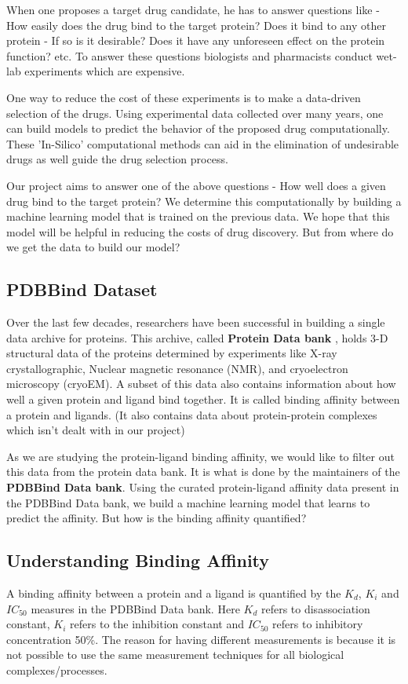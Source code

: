 \documentclass[11pt]{article}
\begin{document}
When one proposes a target drug candidate, he has to answer questions
like - How easily does the drug bind to the target protein?
Does it bind to any other protein - If so is it desirable?
Does it have any unforeseen effect on the protein function?
etc.
To answer these questions biologists and pharmacists conduct wet-lab experiments which are expensive.

One way to reduce the cost of these experiments is to make a data-driven selection of the drugs.
Using experimental data collected over many years, one can build models to predict the
behavior of the proposed drug computationally.
These 'In-Silico' computational methods can aid in the elimination of undesirable drugs as well guide the drug selection process.

Our project aims to answer one of the above questions - How well does a given drug bind to the target protein?
We determine this computationally by building a machine learning model that is trained on the previous data.
We hope that this model will be helpful in reducing the costs of drug discovery.
But from where do we get the data to build our model?

\subsection{PDBBind Dataset}
Over the last few decades, researchers have been successful in building a single data archive for proteins.
This archive, called \textbf{Protein Data bank} \cite{pdb_homepage} , holds 3-D structural data of the proteins determined by experiments
like X-ray crystallographic, Nuclear magnetic resonance (NMR), and cryoelectron microscopy (cryoEM).
A subset of this data also contains information about how well a given protein and ligand bind together.
It is called binding affinity between a protein and ligands.
(It also contains data about protein-protein complexes which isn't dealt with in our project)
\cite{pdbank_history}

As we are studying the protein-ligand binding affinity, we would like to filter out this data from the protein data bank.
It is what is done by the maintainers of the \textbf{PDBBind Data bank}.
\cite{pdbbind_introduction}
Using the curated protein-ligand affinity data present in the PDBBind Data bank, we build a machine learning model that learns to predict the affinity.
But how is the binding affinity quantified?

\subsection{Understanding Binding Affinity}
A binding affinity between a protein and a ligand is quantified by the $K_d$, $K_i$ and $IC_{50}$ measures in the PDBBind Data bank.
Here $K_d$ refers to disassociation constant, $K_i$ refers to the inhibition constant and $IC_{50}$ refers to 
inhibitory concentration 50\%.
The reason for having different measurements is because it is not possible to use the same measurement techniques
for all biological complexes/processes.
\end{document}
